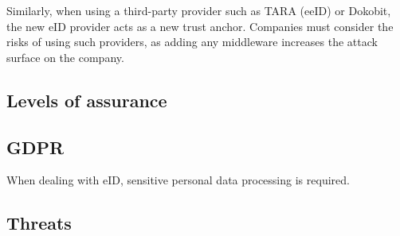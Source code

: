 Similarly, when using a third-party provider such as TARA (eeID) or Dokobit, the new eID provider acts as a new trust anchor. Companies must consider the risks of using such providers, as adding any middleware increases the attack surface on the company.

\subsection{Levels of assurance}


\subsection{GDPR}

When dealing with eID, sensitive personal data processing is required.






\subsection{Threats}


